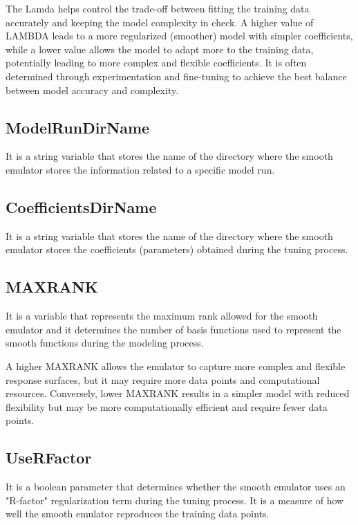 \documentclass[12pt]{article}
\numberwithin{equation}{section}
\numberwithin{figure}{section}
\begin{document}
The Lamda helps control the trade-off between fitting the training data accurately and keeping the model complexity in check. A higher value of LAMBDA leads to a more regularized (smoother) model with simpler coefficients, while a lower value allows the model to adapt more to the training data, potentially leading to more complex and flexible coefficients. It is often determined through experimentation and fine-tuning to achieve the best balance between model accuracy and complexity.

\subsection{ModelRunDirName}
It is a string variable that stores the name of the directory where the smooth emulator stores the information related to a specific model run.    \\

\subsection{CoefficientsDirName} 
It is a string variable that stores the name of the directory where the smooth emulator stores the coefficients (parameters) obtained during the tuning process.   \\

\subsection{MAXRANK}

It is a variable that represents the maximum rank allowed for the smooth emulator and it determines the number of basis functions used to represent the smooth functions during the modeling process. 

A higher MAXRANK allows the emulator to capture more complex and flexible response surfaces, but it may require more data points and computational resources. Conversely, lower MAXRANK results in a simpler model with reduced flexibility but may be more computationally efficient and require fewer data points.


\subsection{UseRFactor}
It is a boolean parameter that determines whether the smooth emulator uses an "R-factor" regularization term during the tuning process. It is a measure of how well the smooth emulator reproduces the training data points.
\end{document}
